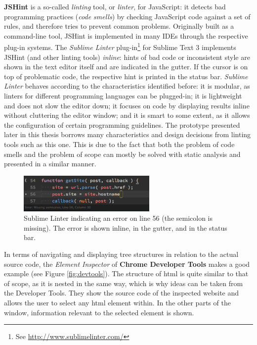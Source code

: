 \textbf{JSHint} is a so-called \emph{linting} tool, or \emph{linter},
for JavaScript: it detects bad programming practices (\emph{code
smells}) by checking JavaScript code against a set of rules, and
therefore tries to prevent common problems. Originally built as a
command-line tool, JSHint is implemented in many IDEs through the
respective plug-in systems. The \emph{Sublime Linter} plug-in\footnote{See
  \url{http://www.sublimelinter.com/}} for Sublime Text 3 implements
JSHint (and other linting tools) \emph{inline}: hints of bad code or
inconsistent style are shown in the text editor itself and are indicated
in the gutter. If the cursor is on top of problematic code, the
respective hint is printed in the status bar. \emph{Sublime Linter}
behaves according to the characteristics identified before: it is
modular, as linters for different programming languages can be
plugged-in; it is lightweight and does not slow the editor down; it
focuses on code by displaying results inline without cluttering the
editor window; and it is smart to some extent, as it allows the
configuration of certain programming guidelines. The prototype presented
later in this thesis borrows many characteristics and design decisions
from linting tools such as this one. This is due to the fact that both
the problem of code smells and the problem of scope can mostly be solved
with static analysis and presented in a similar manner.

\begin{figure}[H]
\centering
\includegraphics[keepaspectratio,width=0.6\textwidth]{img/jshint.png}
\caption{Sublime Linter indicating an error on line 56 (the semicolon is missing). The error is shown inline, in the gutter, and in the status bar.}
\label{fig:sublimelinter}
\end{figure}

In terms of navigating and displaying tree structures in relation to the
actual source code, the \emph{Element Inspector} of \textbf{Chrome
Developer Tools} makes a good example (see Figure \ref{fig:devtools}).
The structure of \acs{html} is quite similar to that of scope, as it is
nested in the same way, which is why ideas can be taken from the
Developer Tools. They show the source code of the inspected website and
allows the user to select any \acs{html} element within. In the other
parts of the window, information relevant to the selected element is
shown.

